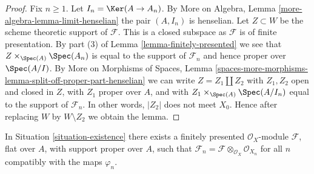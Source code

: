 \begin{proof}
Fix $n \geq 1$. Let $I_n = \Ker(A \to A_n)$.
By More on Algebra, Lemma \ref{more-algebra-lemma-limit-henselian}
the pair $(A, I_n)$ is henselian.
Let $Z \subset W$ be the scheme theoretic support of $\mathcal{F}$.
This is a closed subspace as $\mathcal{F}$ is of finite presentation.
By part (3) of Lemma \ref{lemma-finitely-presented}
we see that $Z \times_{\Spec(A)} \Spec(A_n)$
is equal to the support of $\mathcal{F}_n$ and hence
proper over $\Spec(A/I)$.
By More on Morphisms of Spaces, Lemma
\ref{spaces-more-morphisms-lemma-split-off-proper-part-henselian}
we can write $Z = Z_1 \amalg Z_2$ with $Z_1, Z_2$ open and
closed in $Z$, with $Z_1$ proper
over $A$, and with $Z_1 \times_{\Spec(A)} \Spec(A/I_n)$
equal to the support of $\mathcal{F}_n$.
In other words, $|Z_2|$ does not meet $X_0$.
Hence after replacing $W$ by $W \setminus Z_2$ we obtain the lemma.
\end{proof}

\begin{theorem}
\label{theorem-existence}
In Situation \ref{situation-existence}
there exists a finitely presented $\mathcal{O}_X$-module
$\mathcal{F}$, flat over $A$, with support proper over $A$,
such that
$\mathcal{F}_n = \mathcal{F} \otimes_{\mathcal{O}_X} \mathcal{O}_{X_n}$
for all $n$ compatibly with the maps $\varphi_n$.
\end{theorem}

